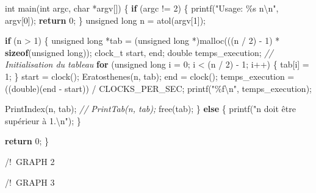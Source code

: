 \documentclass[
]{article}
\newenvironment{Shaded}{}{}
\newcommand{\CommentTok}[1]{\textcolor[rgb]{0.38,0.63,0.69}{\textit{#1}}}
\newcommand{\ControlFlowTok}[1]{\textcolor[rgb]{0.00,0.44,0.13}{\textbf{#1}}}
\newcommand{\DataTypeTok}[1]{\textcolor[rgb]{0.56,0.13,0.00}{#1}}
\newcommand{\DecValTok}[1]{\textcolor[rgb]{0.25,0.63,0.44}{#1}}
\newcommand{\KeywordTok}[1]{\textcolor[rgb]{0.00,0.44,0.13}{\textbf{#1}}}
\newcommand{\NormalTok}[1]{#1}
\newcommand{\SpecialCharTok}[1]{\textcolor[rgb]{0.25,0.44,0.63}{#1}}
\newcommand{\StringTok}[1]{\textcolor[rgb]{0.25,0.44,0.63}{#1}}
\begin{document}
\begin{Shaded}
\begin{Highlighting}[]
\DataTypeTok{int}\NormalTok{ main(}\DataTypeTok{int}\NormalTok{ argc, }\DataTypeTok{char}\NormalTok{ *argv[])}
\NormalTok{\{}
    \ControlFlowTok{if}\NormalTok{ (argc != }\DecValTok{2}\NormalTok{)}
\NormalTok{    \{}
\NormalTok{        printf(}\StringTok{"Usage: \%s n}\SpecialCharTok{\textbackslash{}n}\StringTok{"}\NormalTok{, argv[}\DecValTok{0}\NormalTok{]);}
        \ControlFlowTok{return} \DecValTok{0}\NormalTok{;}
\NormalTok{    \}}
    \DataTypeTok{unsigned} \DataTypeTok{long}\NormalTok{ n = atol(argv[}\DecValTok{1}\NormalTok{]);}

    \ControlFlowTok{if}\NormalTok{ (n \textgreater{} }\DecValTok{1}\NormalTok{)}
\NormalTok{    \{}
        \DataTypeTok{unsigned} \DataTypeTok{long}\NormalTok{ *tab = (}\DataTypeTok{unsigned} \DataTypeTok{long}\NormalTok{ *)malloc(((n / }\DecValTok{2}\NormalTok{) {-} }\DecValTok{1}\NormalTok{) * }\KeywordTok{sizeof}\NormalTok{(}\DataTypeTok{unsigned} \DataTypeTok{long}\NormalTok{));}
\NormalTok{        clock\_t start, end;}
        \DataTypeTok{double}\NormalTok{ temps\_execution;}
        \CommentTok{// Initialisation du tableau}
        \ControlFlowTok{for}\NormalTok{ (}\DataTypeTok{unsigned} \DataTypeTok{long}\NormalTok{ i = }\DecValTok{0}\NormalTok{; i \textless{} (n / }\DecValTok{2}\NormalTok{) {-} }\DecValTok{1}\NormalTok{; i++)}
\NormalTok{        \{}
\NormalTok{            tab[i] = }\DecValTok{1}\NormalTok{;}
\NormalTok{        \}}
\NormalTok{        start = clock();}
\NormalTok{        Eratosthenes(n, tab);}
\NormalTok{        end = clock();}
\NormalTok{        temps\_execution = ((}\DataTypeTok{double}\NormalTok{)(end {-} start)) / CLOCKS\_PER\_SEC;}
\NormalTok{        printf(}\StringTok{"\%f}\SpecialCharTok{\textbackslash{}n}\StringTok{"}\NormalTok{, temps\_execution);}

\NormalTok{        PrintIndex(n, tab);}
        \CommentTok{// PrintTab(n, tab);}
\NormalTok{        free(tab);}
\NormalTok{    \}}
    \ControlFlowTok{else}
\NormalTok{    \{}
\NormalTok{        printf(}\StringTok{"n doit être supérieur à 1.}\SpecialCharTok{\textbackslash{}n}\StringTok{"}\NormalTok{);}
\NormalTok{    \}}

    \ControlFlowTok{return} \DecValTok{0}\NormalTok{;}
\NormalTok{\}}
\end{Highlighting}
\end{Shaded}

\pagebreak

/!~GRAPH 2

\pagebreak

/!~GRAPH 3
\end{document}
